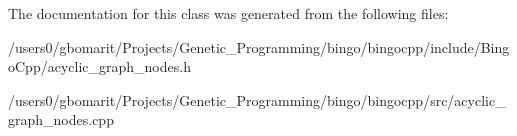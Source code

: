 The documentation for this class was generated from the following files\+:\begin{DoxyCompactItemize}
\item 
/users0/gbomarit/\+Projects/\+Genetic\+\_\+\+Programming/bingo/bingocpp/include/\+Bingo\+Cpp/acyclic\+\_\+graph\+\_\+nodes.\+h\item 
/users0/gbomarit/\+Projects/\+Genetic\+\_\+\+Programming/bingo/bingocpp/src/acyclic\+\_\+graph\+\_\+nodes.\+cpp\end{DoxyCompactItemize}
